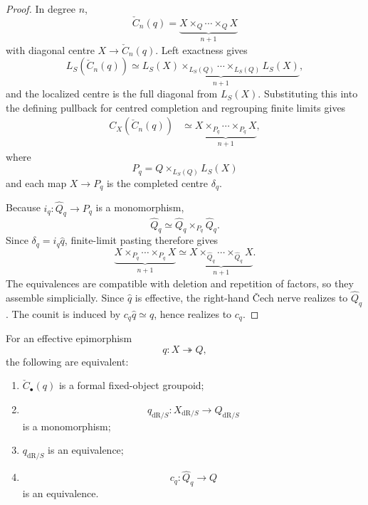 \begin{proof}
In degree $n$,
\[
    \check C_n(q)
    =
    \underbrace{X\times_Q\cdots\times_QX}_{n+1}
\]
with diagonal centre $X\to\check C_n(q)$.  Left exactness gives
\[
    L_S(\check C_n(q))
    \simeq
    \underbrace{
    L_S(X)\times_{L_S(Q)}\cdots\times_{L_S(Q)}L_S(X)
    }_{n+1},
\]
and the localized centre is the full diagonal from $L_S(X)$.  Substituting
this into the defining pullback for centred completion and regrouping finite
limits gives
\[
\begin{aligned}
    C_X(\check C_n(q))
    &\simeq
    \underbrace{
    X\times_{P_q}\cdots\times_{P_q}X
    }_{n+1},
\end{aligned}
\]
where
\[
    P_q
    =
    Q\times_{L_S(Q)}L_S(X)
\]
and each map $X\to P_q$ is the completed centre $\delta_q$.

Because $i_q:\widehat Q_q\to P_q$ is a monomorphism,
\[
    \widehat Q_q
    \simeq
    \widehat Q_q\times_{P_q}\widehat Q_q.
\]
Since $\delta_q=i_q\widehat q$, finite-limit pasting therefore gives
\[
    \underbrace{X\times_{P_q}\cdots\times_{P_q}X}_{n+1}
    \simeq
    \underbrace{
    X\times_{\widehat Q_q}\cdots
    \times_{\widehat Q_q}X
    }_{n+1}.
\]
The equivalences are compatible with deletion and repetition of factors, so
they assemble simplicially.  Since $\widehat q$ is effective, the right-hand
\v{C}ech nerve realizes to $\widehat Q_q$.  The counit is induced by
$c_q\widehat q\simeq q$, hence realizes to $c_q$.
\end{proof}

\begin{theorem}
\label{thm:formal-quotient-monomorphism-recognition}
For an effective epimorphism
\[
    q:X\twoheadrightarrow Q,
\]
the following are equivalent:
\begin{enumerate}
    \item $\check C_\bullet(q)$ is a formal fixed-object groupoid;
    \item
    \[
        q_{\mathrm{dR}/S}:
        X_{\mathrm{dR}/S}
        \longrightarrow
        Q_{\mathrm{dR}/S}
    \]
    is a monomorphism;
    \item $q_{\mathrm{dR}/S}$ is an equivalence;
    \item
    \[
        c_q:\widehat Q_q\longrightarrow Q
    \]
    is an equivalence.
\end{enumerate}
\end{theorem}

